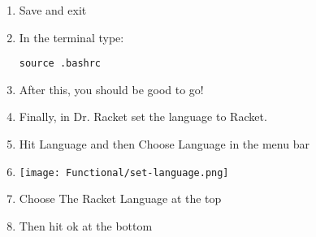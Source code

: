 \documentclass{article}
\begin{document}
\begin{enumerate}
\begin{verbatim}
\end{verbatim}
\item Save and exit
\item In the terminal type:
\begin{verbatim}
source .bashrc
\end{verbatim}
\item After this, you should be good to go!
\item Finally, in Dr. Racket set the language to Racket.
\item Hit Language and then Choose Language in the menu bar
\item \texttt{[image: Functional/set-language.png]}
\item Choose The Racket Language at the top
\item Then hit ok at the bottom
\end{enumerate}
\end{document}
